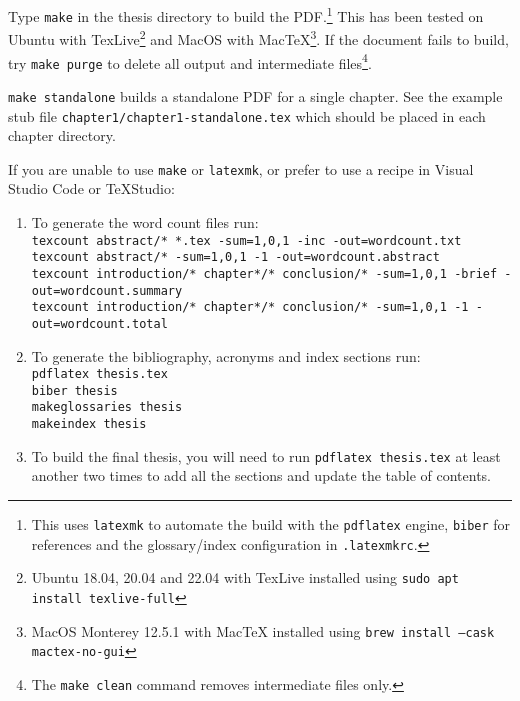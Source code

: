 Type \texttt{make} in the thesis directory to build the PDF.\footnote{This uses \texttt{latexmk}
to automate the build with the \texttt{pdflatex} engine, \texttt{biber} for references and
the glossary/index configuration in \texttt{.latexmkrc}.} This has been tested on
Ubuntu with TexLive\footnote{Ubuntu 18.04, 20.04 and 22.04 with TexLive installed using
\texttt{sudo apt install texlive-full}} and MacOS with MacTeX\footnote{MacOS Monterey 12.5.1
with MacTeX installed using \texttt{brew install --cask mactex-no-gui}}. If the document
fails to build, try \texttt{make purge} to delete all output and intermediate files\footnote{The
\texttt{make clean} command removes intermediate files only.}.

\texttt{make standalone} builds a standalone PDF for a single chapter. See the example
stub file \texttt{chapter1/chapter1-standalone.tex} which should be placed in each
chapter directory.

If you are unable to use \texttt{make} or \texttt{latexmk}, or prefer to use a recipe in
Visual Studio Code or TeXStudio:
\begin{enumerate}
  \item To generate the word count files run:\vspace{1ex}\\
    \texttt{\footnotesize texcount abstract/* *.tex -sum=1,0,1 -inc -out=wordcount.txt\\
    texcount abstract/* -sum=1,0,1 -1 -out=wordcount.abstract\\
    texcount introduction/* chapter*/* conclusion/* -sum=1,0,1 -brief -out=wordcount.summary\\
    texcount introduction/* chapter*/* conclusion/* -sum=1,0,1 -1 -out=wordcount.total}\\
  \item To generate the bibliography, acronyms and index sections run:\vspace{1ex}\\
    \texttt{\footnotesize pdflatex thesis.tex\\
    biber thesis\\
    makeglossaries thesis\\
    makeindex thesis}
  \item To build the final thesis, you will need to run \texttt{pdflatex thesis.tex} at least
    another two times to add all the sections and update the table of contents.
\end{enumerate}
